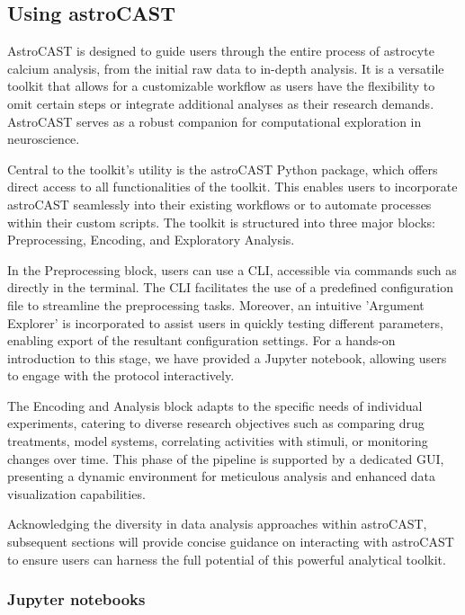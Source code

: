
\subsection{Using astroCAST}

AstroCAST is designed to guide users through the entire process of astrocyte calcium analysis, from the initial raw data to in-depth analysis. It is a versatile toolkit that allows for a customizable workflow as users have the flexibility to omit certain steps or integrate additional analyses as their research demands. AstroCAST serves as a robust companion for computational exploration in neuroscience.

Central to the toolkit's utility is the astroCAST Python package, which offers direct access to all functionalities of the toolkit. This enables users to incorporate astroCAST seamlessly into their existing workflows or to automate processes within their custom scripts. The toolkit is structured into three major blocks: Preprocessing, Encoding, and Exploratory Analysis.

In the Preprocessing block, users can use a \ac{CLI}, accessible via commands such as  directly in the terminal. The \ac{CLI} facilitates the use of a predefined configuration file to streamline the preprocessing tasks. Moreover, an intuitive 'Argument Explorer' is incorporated to assist users in quickly testing different parameters, enabling export of the resultant configuration settings. For a hands-on introduction to this stage, we have provided a Jupyter notebook, allowing users to engage with the protocol interactively.

The Encoding and Analysis block adapts to the specific needs of individual experiments, catering to diverse research objectives such as comparing drug treatments, model systems, correlating activities with stimuli, or monitoring changes over time. This phase of the pipeline is supported by a dedicated \ac{GUI}, presenting a dynamic environment for meticulous analysis and enhanced data visualization capabilities.

Acknowledging the diversity in data analysis approaches within \ac{astroCAST}, subsequent sections will provide concise guidance on interacting with astroCAST to ensure users can harness the full potential of this powerful analytical toolkit.

\subsubsection{Jupyter notebooks}

